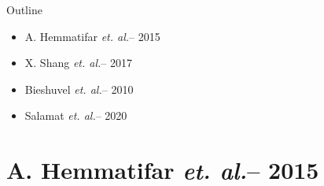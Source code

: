 \documentclass{beamer}
\title[\presentationTitleShort]{\presentationTitleLong}
\subtitle{\presentationSubTitle}
\newcommand{\etal}{{\it et. al.}}
\begin{document}

{
  \begin{frame}
    \maketitle
  \end{frame}
}


\begin{frame}{Outline}
  \begin{itemize}
  \item A. Hemmatifar \etal -- 2015
  \item X. Shang \etal -- 2017
  \item Bieshuvel \etal -- 2010
  \item Salamat \etal -- 2020
  \end{itemize}
\end{frame}



\section{A. Hemmatifar \etal -- 2015}


\end{document}

